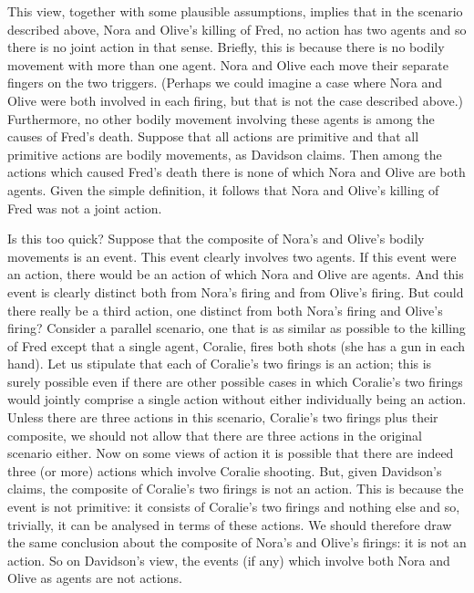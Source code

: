 \documentclass[12pt,a4paper]{extarticle}
\begin{document}
This  view, together with some plausible assumptions, implies that in the scenario described above, Nora and Olive's killing of Fred, no action has two agents and so there is no joint action in that sense.
Briefly, this is because there is no bodily movement with more than one agent.
Nora and Olive each move their separate fingers on the two triggers.
(Perhaps we could imagine a case where Nora and Olive were both involved in each firing, but that is not the case described above.)
Furthermore, no other bodily movement involving these 
agents is among the causes of Fred's death.
Suppose that all actions are primitive and that all primitive actions are  bodily movements, as Davidson claims.
Then among the actions which caused Fred's death there is none of which Nora and Olive are both agents.
Given the simple definition, it follows that Nora and Olive's killing of Fred was not a joint action.

Is this too quick?  
Suppose that the composite of Nora's and  Olive's bodily movements is an event.
This event clearly involves two agents.
If this event were an action, there would be an action of which Nora and Olive are agents.
And this event is clearly distinct both from Nora's firing and from Olive's firing.
But could there really be a third action, one distinct from both Nora's firing and Olive's firing?
Consider a parallel scenario, one that is as similar as possible to the killing of Fred except that a single agent, Coralie, fires both shots (she has a gun in each hand).
Let us stipulate that each of Coralie's two firings is an action; this is surely possible even if there are other possible cases in which Coralie's two firings would jointly comprise a single action without either individually being an action.
Unless there are three actions in this scenario, Coralie's two firings plus their composite, we should not allow that there are three actions in the original scenario either.
Now on  some views of action it is possible that there are indeed three (or more) actions which involve  Coralie shooting.
But, given Davidson's claims, the composite of Coralie's two firings is not an action.
This is because the event is not primitive: it consists of Coralie's two firings and nothing else and so, trivially, it can be analysed in terms of these actions.
We should therefore draw the same conclusion about the composite of Nora's and Olive's firings: it is not an action.
So on Davidson's view, the events (if any) which involve both Nora and Olive as agents are not actions.
\end{document}
